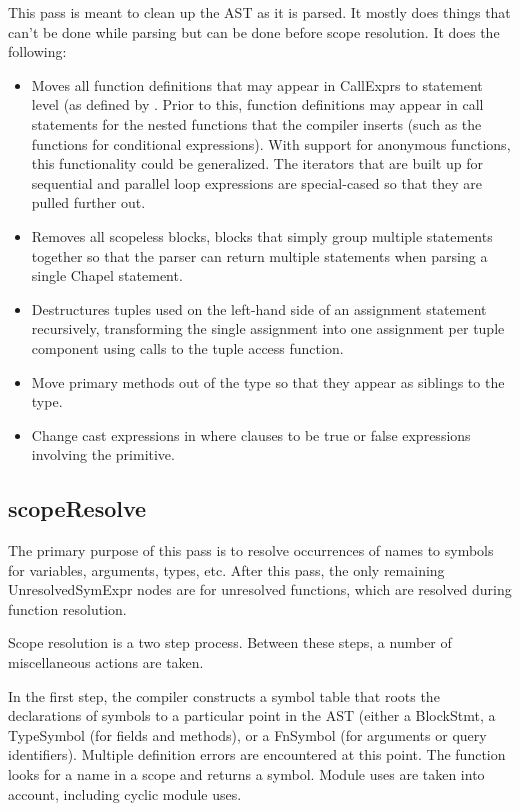 \documentclass[10pt]{article}
\begin{document}
This pass is meant to clean up the AST as it is parsed.  It mostly
does things that can't be done while parsing but can be done before
scope resolution.  It does the following:
\begin{itemize}
\item Moves all function definitions that may appear in CallExprs to
  statement level (as defined by .  Prior to this,
  function definitions may appear in call statements for the nested
  functions that the compiler inserts (such as the functions for
  conditional expressions).  With support for anonymous functions,
  this functionality could be generalized.  The iterators that are
  built up for sequential and parallel loop expressions are
  special-cased so that they are pulled further out.
\item Removes all scopeless blocks, blocks that simply group multiple
  statements together so that the parser can return multiple
  statements when parsing a single Chapel statement.
\item Destructures tuples used on the left-hand side of an assignment
  statement recursively, transforming the single assignment into one
  assignment per tuple component using calls to the tuple access
  function.
\item Move primary methods out of the type so that they appear as
  siblings to the type.
\item Change cast expressions in where clauses to be true or false
  expressions involving the  primitive.
\end{itemize}

\subsection{scopeResolve}

The primary purpose of this pass is to resolve occurrences of names to
symbols for variables, arguments, types, etc.  After this pass, the
only remaining UnresolvedSymExpr nodes are for unresolved functions,
which are resolved during function resolution.

Scope resolution is a two step process.  Between these steps, a number
of miscellaneous actions are taken.

In the first step, the compiler constructs a symbol table that roots
the declarations of symbols to a particular point in the AST (either a
BlockStmt, a TypeSymbol (for fields and methods), or a FnSymbol (for
arguments or query identifiers).  Multiple definition errors are
encountered at this point.  The function  looks for a name
in a scope and returns a symbol.  Module uses are taken into account,
including cyclic module uses.
\end{document}
